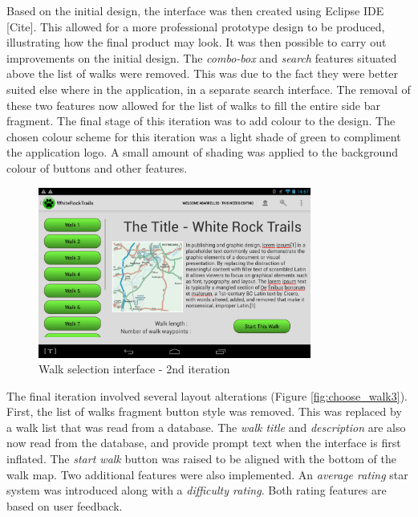 \documentclass[11pt,a4paper]{report}
\begin{document}
Based on the initial design, the interface was then created using Eclipse IDE [Cite]. This allowed for a more professional prototype design to be produced, illustrating how the final product may look. It was then possible to carry out improvements on the initial design. The \emph{combo-box} and \emph{search} features situated above the list of walks were removed. This was due to the fact they were better suited else where in the application, in a separate search interface. The removal of these two features now allowed for the list of walks to fill the entire side bar fragment. The final stage of this iteration was to add colour to the design. The chosen colour scheme for this iteration was a light shade of green to compliment the application logo. A small amount of shading was applied to the background colour of buttons and other features. 

\begin{figure}[H]
    \centering
    \includegraphics[width=0.8\textwidth]{chris/app_choose_walk}
    \caption{Walk selection interface - 2nd iteration}
    \label{fig:choose_walk2}
\end{figure}

The final iteration involved several layout alterations (Figure \ref*{fig:choose_walk3}). First, the list of walks fragment button style was removed. This was replaced by a walk list that was read from a database. The \emph{walk title} and \emph{description} are also now read from the database, and provide prompt text when the interface is first inflated. The \emph{start walk} button was raised to be aligned with the bottom of the walk map. Two additional features were also implemented. An \emph{average rating} star system was introduced along with a \emph{difficulty rating}. Both rating features are based on user feedback.
\end{document}
